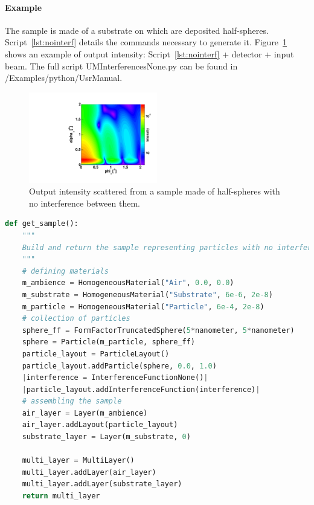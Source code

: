 \paragraph{Example} The sample is made of a substrate on which are deposited half-spheres. Script~\ref{lst:nointerf} details the commands necessary to generate it. Figure~\ref{fig:nointerf} shows an example of output intensity: Script~\ref{lst:nointerf}  + detector + input beam. The full script UMInterferencesNone.py can be found in /Examples/python/UsrManual. 


\begin{figure}[h]
\begin{center}
\includegraphics[width=0.5\textwidth]{Figures/HSphere_NoInterf}
\end{center}
\caption{Output intensity scattered from a sample made of half-spheres with no interference between them.}
\label{fig:nointerf}
\end{figure}

\FloatBarrier
\newpage

\begin{lstlisting}[language=python, style=eclipseboxed,numbers=none,nolol,caption={\Code{Python} script to simulate a sample made of half-spheres deposited on a substrate layer without any interference. The part specific to the interferences is marked in red italic font.},label={lst:nointerf}]
def get_sample():
    """
    Build and return the sample representing particles with no interference
    """
    # defining materials
    m_ambience = HomogeneousMaterial("Air", 0.0, 0.0)
    m_substrate = HomogeneousMaterial("Substrate", 6e-6, 2e-8)
    m_particle = HomogeneousMaterial("Particle", 6e-4, 2e-8)
    # collection of particles
    sphere_ff = FormFactorTruncatedSphere(5*nanometer, 5*nanometer)
    sphere = Particle(m_particle, sphere_ff)
    particle_layout = ParticleLayout()
    particle_layout.addParticle(sphere, 0.0, 1.0)
    |interference = InterferenceFunctionNone()| 
    |particle_layout.addInterferenceFunction(interference)|
    # assembling the sample
    air_layer = Layer(m_ambience)
    air_layer.addLayout(particle_layout)
    substrate_layer = Layer(m_substrate, 0)

    multi_layer = MultiLayer()
    multi_layer.addLayer(air_layer)
    multi_layer.addLayer(substrate_layer)
    return multi_layer
\end{lstlisting}

